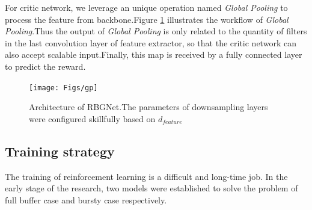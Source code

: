 \documentclass[conference,compsocconf]{IEEEtran}
\begin{document}
For critic network, we leverage an unique operation named \textit{Global Pooling} to process the feature from backbone.\cite{Lin2013Network}Figure \ref{fig:gp} illustrates the workflow of \textit{Global Pooling}.Thus the output of \textit{Global Pooling} is only related to the quantity of filters in the last convolution layer of feature extractor, so that the critic network can also accept scalable input.Finally, this map is received by a fully connected layer to predict the reward.

\begin{figure}[htp]
	\centering
	\texttt{[image: Figs/gp]}
	\caption{Architecture of RBGNet.The parameters of downsampling layers were configured skillfully based on $ d_{feature} $}\label{fig:gp}
\end{figure}

\subsection{Training strategy}
The training of reinforcement learning is a difficult and long-time job.
In the early stage of the research, two models were established to solve the problem of full buffer case and bursty case respectively.
\end{document}
